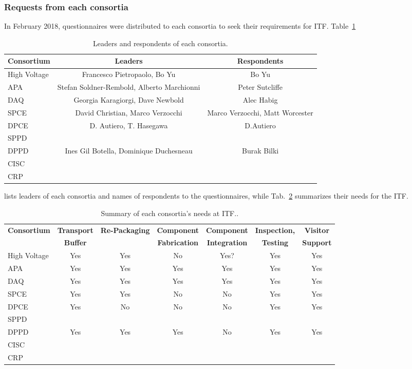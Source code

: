 \subsubsection{\bf Requests from each consortia} 
In February 2018, questionnaires were distributed to each consortia to seek
their requirements for ITF. Table~\ref{table:leders} 
\begin{table}[htbp]
\caption{Leaders and respondents of each consortia.}
\label{table:leders}
\begin{center}
\begin{tabular}{|l|c|c|} \hline
{\bf Consortium} & {\bf Leaders} &{\bf Respondents} \\\hline
High Voltage & Francesco Pietropaolo, Bo Yu & Bo Yu \\ \hline
APA & Stefan Soldner-Rembold, Alberto Marchionni & Peter Sutcliffe \\ \hline
DAQ & Georgia Karagiorgi, Dave Newbold & Alec Habig \\ \hline
SPCE & David Christian, Marco Verzocchi  & Marco Verzocchi, Matt Worcester\\ \hline
DPCE & D. Autiero, T. Hasegawa &  D.Autiero  \\ \hline
SPPD & & \\ \hline
DPPD & Ines Gil Botella, Dominique Duchesneau & Burak Bilki \\ \hline
CISC & &   \\ \hline
CRP & &  \\   \hline
\end{tabular}
\end{center}
\end{table}
lists leaders of each consortia and names of respondents to the
questionnaires, while Tab.~\ref{table:responses} summarizes their
needs for the ITF.
\begin{table}[htbp]
\caption{Summary of each consortia's needs at ITF..}
\label{table:responses}
\begin{center}
\scalebox{0.95}
{
\begin{tabular}{|l|c|c|c|c|c|c| } 
\hline
{\bf Consortium} & {\bf Transport} &{\bf Re-Packaging}&{\bf Component}
&{\bf Component}&{\bf Inspection,}&{\bf Visitor} \\
 & {\bf Buffer} &{\bf }&{\bf Fabrication}
&{\bf Integration}&{\bf Testing}&{\bf Support} \\ \hline 
High Voltage & Yes & Yes & No & Yes? & Yes & Yes \\ \hline
APA & Yes & Yes & Yes & Yes & Yes & Yes \\ \hline
DAQ & Yes & Yes & Yes & Yes & Yes & Yes \\ \hline
SPCE & Yes & Yes & No & No & Yes & Yes \\ \hline
DPCE & Yes & No & No & No & Yes & Yes \\ \hline
SPPD & & & & & &  \\ \hline
DPPD & Yes & Yes & Yes & No & Yes & Yes \\ \hline
CISC & & & & & &  \\ \hline
CRP & & & & & &  \\   \hline
\end{tabular}
}
\end{center}
\end{table}
